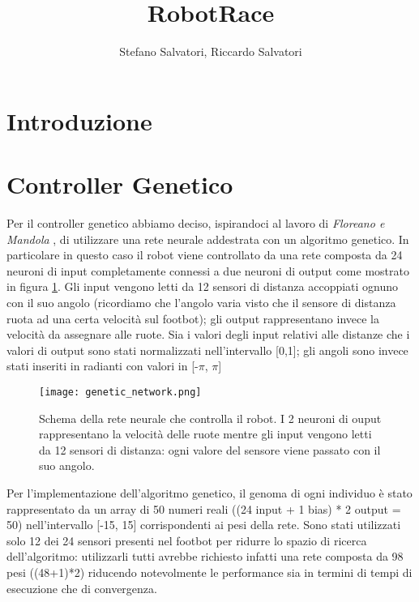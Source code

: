 \documentclass[]{report}
\title{RobotRace}
\author{Stefano Salvatori, Riccardo Salvatori}
\begin{document}
\maketitle

\section{Introduzione}


\section{Controller Genetico}
Per il controller genetico abbiamo deciso, ispirandoci al lavoro di \textit{Floreano e Mandola} \cite{genetic_evolution_nn},  di utilizzare una rete neurale addestrata con un algoritmo genetico. In particolare in questo caso il robot viene controllato da una rete composta da 24 neuroni di input completamente connessi a due neuroni di output come mostrato in figura \ref{fig:genetic_network}.
Gli input vengono letti da 12 sensori di distanza accoppiati ognuno con il suo angolo (ricordiamo che l'angolo varia visto che il sensore di distanza ruota ad una certa velocità sul footbot); gli output rappresentano invece la velocità da assegnare alle ruote. Sia i valori degli input relativi alle distanze che i valori di output sono stati normalizzati nell'intervallo [0,1]; gli angoli sono invece stati inseriti in radianti con valori in [-$\pi$, $\pi$]
\begin{figure}[h]
\centering
\texttt{[image: genetic\_network.png]}
\caption{Schema della rete neurale che controlla il robot. I 2 neuroni di ouput rappresentano la velocità delle ruote mentre gli input vengono letti da  12 sensori di distanza: ogni valore del sensore viene passato con il suo angolo. }
\label{fig:genetic_network}
\end{figure}


Per l'implementazione dell'algoritmo genetico, il genoma di ogni individuo è stato rappresentato da un array di 50 numeri reali ((24 input + 1 bias) * 2  output = 50) nell'intervallo [-15, 15] corrispondenti ai pesi della rete. Sono stati utilizzati solo 12 dei 24 sensori presenti nel footbot per ridurre lo spazio di ricerca dell'algoritmo: utilizzarli tutti avrebbe richiesto infatti una rete composta da 98 pesi ((48+1)*2) riducendo notevolmente le performance sia in termini di tempi di esecuzione che di convergenza.
\end{document}
